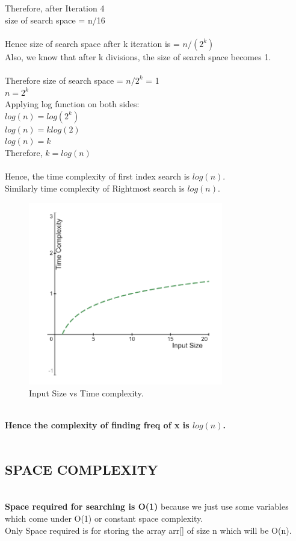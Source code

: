 \documentclass[conference]{IEEEtran}
\begin{document}
Therefore, after Iteration 4 \\
size of search space = n/16 \\ \\ 
Hence size of search space after k iteration
is = $n/(2^k)$ \\
Also, we know that after k divisions, the size of search space becomes 1. \\ \\
Therefore size of search space = $n/2^k$ = 1 \\
$ n = 2^k $ \\ 
Applying log function on both sides: \\ 
$ log(n) = log(2^k)$ \\ 
$ log(n) = k log(2)$ \\
$ log(n) = k$ \\

Therefore,
$k = log(n)$ \\ \\ 
Hence, the time complexity of first index
search is $log(n)$. \\ 
Similarly time complexity of Rightmost
search is $log(n)$. \\ 

\begin{figure}[h!]
\centerline{\includegraphics[width=85mm,height=80mm ]{TC.png}}
\caption{Input Size vs Time complexity.}
\label{fig2}
\end{figure} \\
\textbf{
Hence the complexity of finding freq of x is $log(n)$.} \\ \\

\subsection{SPACE COMPLEXITY} \\
\textbf{Space required for searching is O(1)} because we just use some variables which come under O(1) or constant space
complexity. \\ 
Only Space required is for storing the array arr[] of size n which will be O(n).
\end{document}
